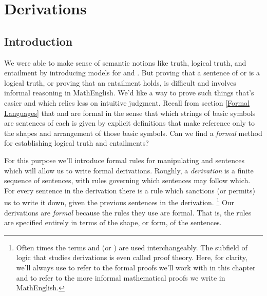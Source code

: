
\chapter{Derivations}\label{Derivations}

\section{Introduction}\label{Derivation Preliminaries}


We were able to make sense of semantic notions like truth, logical truth, and entailment by introducing models for \GSL{} and \GQL{}.
But proving that a sentence of \GSL{} or \GQL{} is a logical truth, or proving that an entailment holds, is difficult and involves informal reasoning in MathEnglish. 
We'd like a way to prove such things that's easier and which relies less on intuitive judgment. 
Recall from section \ref{Formal Languages} that \GSL{} and \GQL{} are formal in the sense that which strings of basic symbols are sentences of each is given by explicit definitions that make reference only to the shapes and arrangement of those basic symbols. 
Can we find a \emph{formal} method for establishing logical truth and entailments?

For this purpose we'll introduce formal rules for manipulating \GSL{} and \GQL{} sentences which will allow us to write formal derivations. 
Roughly, a \emph{derivation} is a finite sequence of sentences, with rules governing which sentences may follow which. 
For every sentence in the derivation there is a rule which sanctions (or permits) us to write it down, given the previous sentences in the derivation.%
\footnote{%
Often times the terms  and  (or ) are used interchangeably. 
The subfield of logic that studies derivations is even called proof theory.
Here, for clarity, we'll always use  to refer to the formal proofs we'll work with in this chapter and  to refer to the more informal mathematical proofs we write in MathEnglish.
} 
Our derivations are \emph{formal} because the rules they use are formal.
That is, the rules are specified entirely in terms of the shape, or form, of the sentences.

